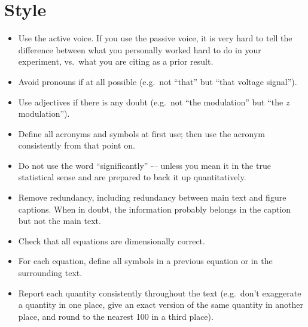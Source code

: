 \documentclass[aps,prb,twocolumn,superscriptaddress,floatfix,longbibliography]{revtex4-2}
\begin{document}
\section{\label{sec:Style}Style}

\begin{itemize}[label=$\Box$]
\item Use the active voice. If you use the passive voice, it is very hard to tell the difference between what you personally worked hard to do in your experiment, vs.\ what you are citing as a prior result.
\item Avoid pronouns if at all possible (e.g.\ not ``that'' but ``that voltage signal'').
\item Use adjectives if there is any doubt (e.g.\ not ``the modulation'' but ``the $z$ modulation'').
\item Define all acronyms and symbols at first use; then use the acronym consistently from that point on.
\item Do not use the word ``significantly'' -– unless you mean it in the true statistical sense and are prepared to back it up quantitatively.
\item Remove redundancy, including redundancy between main text and figure captions. When in doubt, the information probably belongs in the caption but not the main text.
\item Check that all equations are dimensionally correct.
\item For each equation, define all symbols in a previous equation or in the surrounding text.
\item Report each quantity consistently throughout the text (e.g.\ don't exaggerate a quantity in one place, give an exact version of the same quantity in another place, and round to the nearest 100 in a third place).

\end{itemize}
\end{document}
